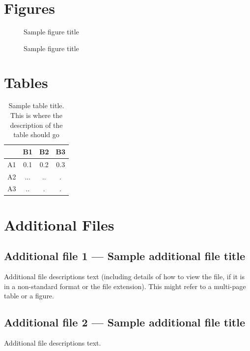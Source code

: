 \documentclass{bmcart}
\begin{document}
\begin{backmatter}
\section*{Figures}
  \begin{figure}[h!]
  \caption{Sample figure title}
\end{figure}

\begin{figure}[h!]
  \caption{Sample figure title}
\end{figure}


\section*{Tables}
\begin{table}[h!]
\caption{Sample table title. This is where the description of the table should go}
  \begin{tabular}{cccc}
    \hline
    & B1  &B2   & B3\\ \hline
    A1 & 0.1 & 0.2 & 0.3\\
    A2 & ... & ..  & .\\
    A3 & ..  & .   & .\\ \hline
  \end{tabular}
\end{table}


\section*{Additional Files}
  \subsection*{Additional file 1 --- Sample additional file title}
    Additional file descriptions text (including details of how to
    view the file, if it is in a non-standard format or the file extension).  This might
    refer to a multi-page table or a figure.

  \subsection*{Additional file 2 --- Sample additional file title}
    Additional file descriptions text.

\end{backmatter}
\end{document}
